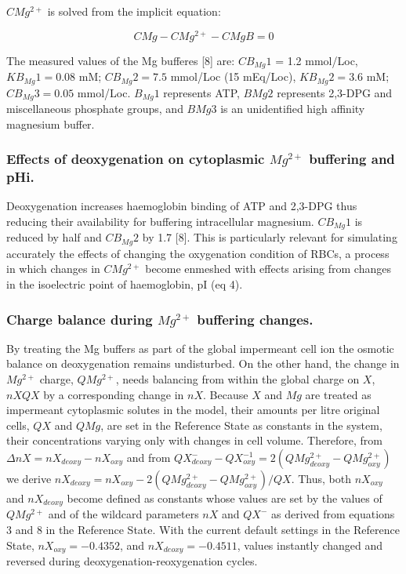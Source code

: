 \documentclass[a4paper]{article}
\newcommand{\cell}[1]{C#1}
\newcommand{\CMgtp}{\cell{Mg^{2+}}}
\newcommand{\CMgB}{\cell{MgB}}
\newcommand{\CMg}{\cell{Mg}}
\begin{document}
$\CMgtp$ is solved from the implicit equation: 

\begin{equation}
\CMg - \CMgtp - \CMgB = 0
\end{equation}


The measured values of the Mg bufferes [8] are: $CB_{Mg}1$ = 1.2 mmol/Loc, $KB_{Mg}1 = 0.08$ mM; $CB_{Mg}2 = 7.5$ mmol/Loc (15 mEq/Loc), $KB_{Mg}2 = 3.6$ mM; $CB_{Mg}3 = 0.05$ mmol/Loc. $B_{Mg}1$ represents ATP, $BMg2$ represents 2,3-DPG and miscellaneous phosphate groups, and $BMg3$ is an unidentified high affinity magnesium buffer.  



\subsubsection{Effects of deoxygenation on cytoplasmic $Mg^{2+}$ buffering and pHi.}
Deoxygenation increases haemoglobin binding of ATP and 2,3-DPG thus reducing their availability for buffering intracellular magnesium.  $CB_{Mg}1$ is reduced by half and $CB_{Mg}2$ by 1.7 [8].  This is particularly relevant for simulating accurately the effects of changing the oxygenation condition of RBCs, a process in which changes in $CMg^{2+}$ become enmeshed with effects arising from changes in the isoelectric point of haemoglobin, pI (eq 4).

\subsubsection{Charge balance during $Mg^{2+}$ buffering changes.}

By treating the Mg buffers as part of the global impermeant cell ion the osmotic balance on deoxygenation remains
undisturbed. On the other hand, the change in $Mg^{2+}$ charge, $QMg^{2+}$, needs balancing from within the global charge
on $X$, $nXQX$ by a corresponding change in $nX$. Because $X$ and $Mg$ are treated as impermeant cytoplasmic solutes
in the model, their amounts per litre original cells, $QX$ and $QMg$, are set in the Reference State as constants in the
system, their concentrations varying only with changes in cell volume. Therefore, from $\Delta nX = nX_{deoxy} - nX_{oxy}$
and from $QX^{-}_{deoxy} - QX^{-1}_{oxy} = 2(QMg^{2+}_{deoxy} - QMg^{2+}_{oxy})$ we derive $nX_{deoxy} = nX_{oxy} - 2(QMg^{2+}_{deoxy} - QMg^{2+}_{oxy})/QX$.
Thus, both $nX_{oxy}$ and $nX_{deoxy}$ become defined as constants whose values are set by the values of $QMg^{2+}$ and of the
wildcard parameters $nX$ and $QX^{-}$ as derived from equations 3 and 8 in the Reference State. With the current default
settings in the Reference State, $nX_{oxy} =-0.4352$, and $nX_{deoxy} =-0.4511$, values instantly changed and reversed during
deoxygenation-reoxygenation cycles.
\end{document}
